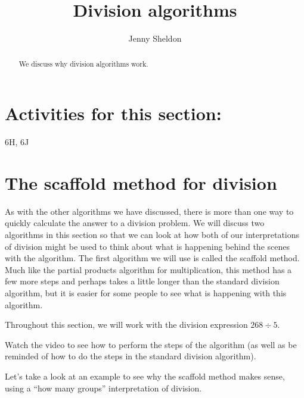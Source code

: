 \documentclass{ximera}
\title{Division algorithms}
\author{Jenny Sheldon}
\begin{document}
\begin{abstract}
We discuss why division algorithms work.
\end{abstract}
\maketitle

\section{Activities for this section:} 6H, 6J

\section{The scaffold method for division}

As with the other algorithms we have discussed, there is more than one way to quickly calculate the answer to a division problem. We will discuss two algorithms in this section so that we can look at how both of our interpretations of division might be used to think about what is happening behind the scenes with the algorithm. The first algorithm we will use is called the scaffold method. Much like the partial products algorithm for multiplication, this method has a few more steps and perhaps takes a little longer than the standard division algorithm, but it is easier for some people to see what is happening with this algorithm.

Throughout this section, we will work with the division expression $268 \div 5$.

Watch the video to see how to perform the steps of the algorithm (as well as be reminded of how to do the steps in the standard division algorithm).


Let's take a look at an example to see why the scaffold method makes sense, using a ``how many groups'' interpretation of division.
\end{document}

